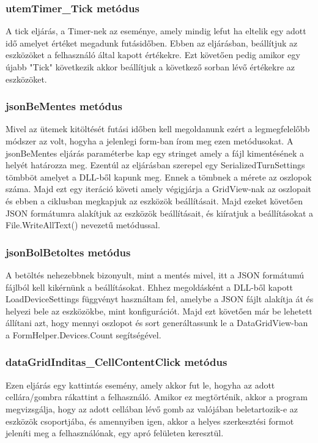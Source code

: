 \documentclass[tocnopagenum]{thesis-ekf}
\theoremstyle{definition}
\theoremstyle{remark}
\begin{document}
	\subsubsection{utemTimer\_Tick metódus}
	A tick eljárás, a Timer-nek az eseménye, amely mindig lefut ha eltelik egy adott idő amelyet értéket megadunk futásidőben. Ebben az eljárásban, beállítjuk az eszközöket a felhasználó által kapott értékekre. Ezt követően pedig amikor egy újabb "Tick" következik akkor beállítjuk a következő sorban lévő értékekre az eszközöket.
	\subsubsection{jsonBeMentes metódus}
	Mivel az ütemek kitöltését futási időben kell megoldanunk ezért a legmegfelelőbb módszer az volt, hogyha a jelenlegi form-ban írom meg ezen metódusokat.
	A jsonBeMentes eljárás paraméterbe kap egy stringet amely a fájl kimentésének a helyét határozza meg. Ezentúl az eljárásban szerepel egy SerializedTurnSettings tömbböt amelyet a DLL-ből kapunk meg. Ennek a tömbnek a mérete az oszlopok száma. Majd ezt egy iteráció követi amely végigjárja a GridView-nak az oszlopait és ebben a ciklusban megkapjuk az eszközök beállításait.
	Majd ezeket követően JSON formátumra alakítjuk az eszközök beállításait, és kiíratjuk a beállításokat a File.WriteAllText() nevezetű metódussal.
	
	\subsubsection{jsonBolBetoltes metódus}
	
	A betöltés nehezebbnek bizonyult, mint a mentés mivel, itt a JSON formátumú fájlból kell kikérnünk a beállításokat.
	Ehhez megoldásként a DLL-ből kapott LoadDeviceSettings függvényt használtam fel, amelybe a JSON fájlt alakítja át és helyezi bele az eszközökbe, mint konfigurációt. Majd ezt követően már be lehetett állítani azt, hogy mennyi oszlopot és sort generáltassunk le a DataGridView-ban a FormHelper.Devices.Count segítségével.
	
	\subsubsection{dataGridInditas\_CellContentClick metódus}
	Ezen eljárás egy kattintás esemény, amely akkor fut le, hogyha az adott cellára/gombra rákattint a felhasználó.
	Amikor ez megtörténik, akkor a program megvizsgálja, hogy az adott cellában lévő gomb az valójában beletartozik-e az eszközök csoportjába, és amennyiben igen, akkor a helyes szerkesztési formot jeleníti meg a felhasználónak, egy apró felületen keresztül.
	
\end{document}
